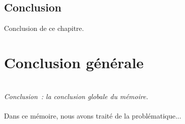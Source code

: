\documentclass[a4paper,11pt,twoside]{memoir}
\begin{document}
\section{Conclusion}
Conclusion de ce chapitre.



\cleardoublepage{} %
\chapter*{Conclusion générale}
\adjustmtc
{}
\textit{\\Conclusion~: la conclusion globale du mémoire.}\\\\
Dans ce mémoire, nous avons traité de la problématique...



\cleardoublepage{}
 

\appendix
\cleardoublepage{}





\cleardoublepage %
\printindex %

\end{document}
